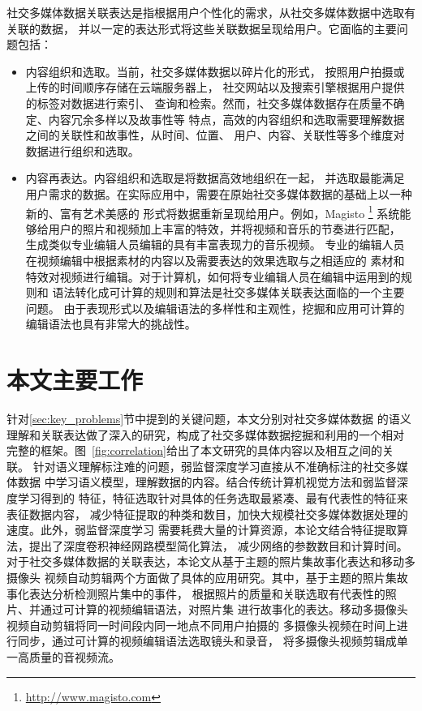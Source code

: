 \documentclass[doctor]{ustcthesis}
\begin{document}
社交多媒体数据关联表达是指根据用户个性化的需求，从社交多媒体数据中选取有关联的数据，
并以一定的表达形式将这些关联数据呈现给用户。它面临的主要问题包括：
\begin{itemize}
    \item 内容组织和选取。当前，社交多媒体数据以碎片化的形式，
        按照用户拍摄或上传的时间顺序存储在云端服务器上，
        社交网站以及搜索引擎根据用户提供的标签对数据进行索引、
        查询和检索。然而，社交多媒体数据存在质量不确定、内容冗余多样以及故事性等
        特点，高效的内容组织和选取需要理解数据之间的关联性和故事性，从时间、位置、
        用户、内容、关联性等多个维度对数据进行组织和选取。
    \item 内容再表达。内容组织和选取是将数据高效地组织在一起，
        并选取最能满足用户需求的数据。在实际应用中，需要在原始社交多媒体数据的基础上以一种新的、富有艺术美感的
        形式将数据重新呈现给用户。例如，Magisto \footnote{\url{http://www.magisto.com}}
        系统能够给用户的照片和视频加上丰富的特效，并将视频和音乐的节奏进行匹配，
        生成类似专业编辑人员编辑的具有丰富表现力的音乐视频。
        专业的编辑人员在视频编辑中根据素材的内容以及需要表达的效果选取与之相适应的
        素材和特效对视频进行编辑。对于计算机，如何将专业编辑人员在编辑中运用到的规则和
        语法转化成可计算的规则和算法是社交多媒体关联表达面临的一个主要问题。
        由于表现形式以及编辑语法的多样性和主观性，挖掘和应用可计算的编辑语法也具有非常大的挑战性。
\end{itemize}

\section{本文主要工作}
针对\ref{sec:key_problems}节中提到的关键问题，本文分别对社交多媒体数据
的语义理解和关联表达做了深入的研究，构成了社交多媒体数据挖掘和利用的一个相对
完整的框架。图~\ref{fig:correlation}给出了本文研究的具体内容以及相互之间的关联。
针对语义理解标注难的问题，弱监督深度学习直接从不准确标注的社交多媒体数据
中学习语义模型，理解数据的内容。结合传统计算机视觉方法和弱监督深度学习得到的
特征，特征选取针对具体的任务选取最紧凑、最有代表性的特征来表征数据内容，
减少特征提取的种类和数目，加快大规模社交多媒体数据处理的速度。此外，弱监督深度学习
需要耗费大量的计算资源，本论文结合特征提取算法，提出了深度卷积神经网路模型简化算法，
减少网络的参数数目和计算时间。对于社交多媒体数据的关联表达，本论文从基于主题的照片集故事化表达和移动多摄像头
视频自动剪辑两个方面做了具体的应用研究。其中，基于主题的照片集故事化表达分析检测照片集中的事件，
根据照片的质量和关联选取有代表性的照片、并通过可计算的视频编辑语法，对照片集
进行故事化的表达。移动多摄像头视频自动剪辑将同一时间段内同一地点不同用户拍摄的
多摄像头视频在时间上进行同步，通过可计算的视频编辑语法选取镜头和录音，
将多摄像头视频剪辑成单一高质量的音视频流。
\end{document}
